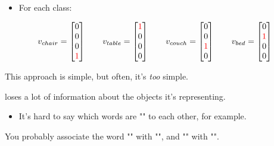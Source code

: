         \begin{itemize}
            \item For each class:
        \end{itemize}
        
        
        \begin{equation}
            v_{chair} = 
            \begin{bmatrix}
              0\\0\\0\\ \textcolor{red}{1}
            \end{bmatrix}
            \qquad
            v_{table} = 
            \begin{bmatrix}
              \textcolor{red}{1}\\0\\0\\0
            \end{bmatrix}
            \qquad
            v_{couch} = 
            \begin{bmatrix}
              0\\0\\\textcolor{red}{1}\\0
            \end{bmatrix}
            \qquad
            v_{bed} = 
            \begin{bmatrix}
              0\\\textcolor{red}{1}\\0\\0
            \end{bmatrix}
        \end{equation}

        This approach is simple, but often, it's \textit{too} simple.\\

        \begin{concept}
             loses a lot of information about the objects it's representing.

            \begin{itemize}
                \item It's hard to say which words are "" to each other, for example.
            \end{itemize}
        \end{concept}

        \miniex You probably associate the word "" with "", and "" with "".

